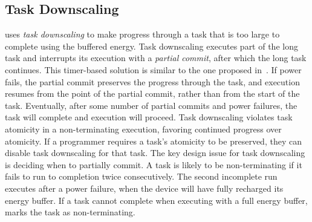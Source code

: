 
\subsection{Task Downscaling}
\label{sec:task_downsizing}

\sys uses {\em task downscaling} to make progress through a task that is too large to complete using the buffered energy. Task downscaling executes part of the long task and interrupts its execution with a {\em partial commit}, after which the long task continues. This timer-based solution is similar to the one proposed in~\cite{ratchet}. If power fails, the partial commit preserves the progress through the task, and execution resumes from the point of the partial commit, rather than from the start of the task. Eventually, after some number of partial commits and power failures, the task will complete and execution will proceed. Task downscaling violates task atomicity in a non-terminating execution, favoring continued progress over atomicity. If a programmer requires a task's atomicity to be preserved, they can disable task downscaling for that task. The key design issue for task downscaling is deciding when to partially commit. A task is likely to be non-terminating if it fails to run to completion twice consecutively. 
The second incomplete run executes after a power failure, when the device will have fully recharged its energy buffer. If a task cannot complete when executing with a full energy buffer, \sys marks the task as non-terminating.